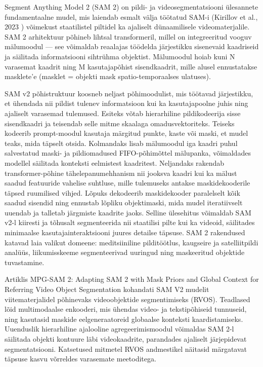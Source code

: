 Segment Anything Model 2 (SAM 2) on pildi- ja videosegmentatsiooni ülesannete
fundamentaalne mudel, mis laiendab esmalt välja töötatud SAM-i  (Kirillov et al., 2023 \cite{kirillovSegmentAnything2023})
 võimekust staatilistel piltidel ka ajaliselt dünaamilisele
videomaterjalile. SAM 2 arhitektuur põhineb lihtsal transformeril, millel on
integreeritud vooguv mälumoodul --- see võimaldab reaalajas töödelda järjestikku
sisenevaid kaadriseid ja säilitada informatsiooni sihtrühma objektist.
Mälumoodul hoiab kuni N varasemat kaadrit ning M kasutajapõhist sisendkaadrit,
mille alusel ennustatakse masklete'e (masklet = objekti mask spatio-temporaalses
ulatuses). \cite{raviSAM2Segment2024}

SAM v2 põhistruktuur koosneb neljast põhimoodulist, mis töötavad järjestikku, et
ühendada nii pildist tulenev informatsioon kui ka kasutajapoolne juhis ning
ajaliselt varasemad tulemused. Esiteks võtab hierarhiline pildikodeerija sisse
sisendkaadri ja teisendab selle mitme skaalaga
omadusvektoriteks. Teiseks kodeerib prompt-moodul kasutaja märgitud punkte,
kaste või maski, et mudel teaks, mida täpselt otsida. Kolmandaks lisab
mälumoodul iga kaadri puhul salvestatud maski- ja pildiomadused FIFO-põhimõttel
mälupanka, võimaldades modellel säilitada konteksti eelmistest kaadritest.
Neljandaks rakendab transformer-põhine tähelepanumehhanism nii jooksva kaadri
kui ka mälust saadud featuuride vahelise suhtluse, mille tulemuseks antakse
maskidekooderile täpsed ruumilised vihjed. Lõpuks dekodeerib maskidekooder
paralelselt kõik saadud sisendid ning ennustab lõpliku objektimaski, mida mudel
iteratiivselt uuendab ja talletab järgmiste kaadrite jaoks. Selline ülesehitus
võimaldab SAM v2-l kiiresti ja tõhusalt segmenteerida nii staatilisi pilte kui
ka videoid, säilitades minimaalse kasutajainteraktsiooni juures detailse täpsuse.
SAM 2 rakendused katavad laia valikut domeene: meditsiiniline pilditöötlus,
kaugseire ja satelliitpildi analüüs, liikumisskeeme segmenteerivad uuringud ning
maskeeritud objektide tuvastamine. \cite{raviSAM2Segment2024}

Artiklis  \glqq MPG-SAM 2: Adapting SAM 2 with Mask Priors and Global Context for Referring Video Object Segmentation\grqq{} kohandati SAM V2 mudelit viitematerjalidel põhinevaks
videoobjektide segmentimiseks (RVOS). Teadlased lõid multimodaalse enkooderi,
mis ühendas video- ja tekstipõhiseid tunnuseid, ning kasutasid maskide
eelgeneraatoreid globaalse konteksti kaardistamiseks. Uuenduslik hierarhiline
ajalooline agregeerimismoodul võimaldas SAM 2-l säilitada objekti kontuure läbi
videokaadrite, parandades ajaliselt järjepidevat segmentatsiooni. Katsetused
mitmetel RVOS andmestikel näitasid märgatavat täpsuse kasvu võrreldes varasemate
meetoditega. \cite{rongMPGSAM2Adapting2025}

